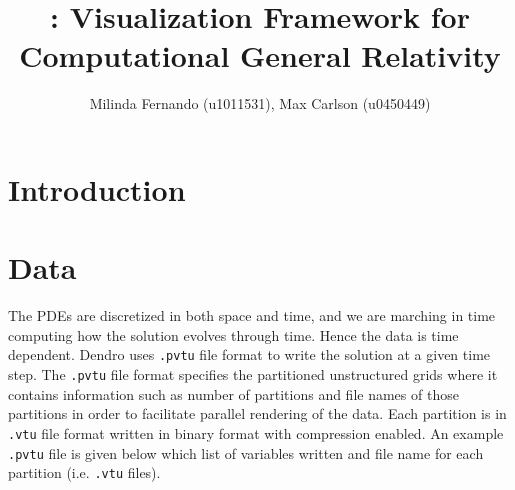 \documentclass[a4paper,10pt]{article}
\title{\grvis : Visualization Framework for Computational General Relativity}
\author{Milinda Fernando (u1011531), Max Carlson (u0450449)}
\begin{document}
\maketitle

\section{Introduction}


\section{Data}
The PDEs are discretized in both space and time, and we are marching in time computing how the solution evolves through time. Hence the data is time dependent. Dendro uses \texttt{.pvtu} file format to write the solution at a given time step. The \texttt{.pvtu} file format specifies the partitioned unstructured grids where it contains information such as number of partitions and file names of those partitions in order to facilitate parallel rendering of the data. Each partition is in \texttt{.vtu} file format written in binary format with compression enabled. An example \texttt{.pvtu} file is given below which list of variables written and file name for each partition (i.e. \texttt{.vtu} files). 
\end{document}
